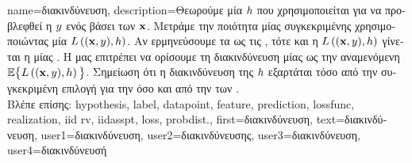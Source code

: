 {name={\foreignlanguage{greek}{διακινδύνευση}},
	description={\foreignlanguage{greek}{Θεωρούμε μία} 
		 $h$ \foreignlanguage{greek}{που χρησιμοποιείται για να προβλεφθεί η}  
		$y$ \foreignlanguage{greek}{ενός}  \foreignlanguage{greek}{βάσει των}  ${\bf x}$. 
		\foreignlanguage{greek}{Μετράμε την ποιότητα μίας συγκεκριμένης}  
		 \foreignlanguage{greek}{χρησιμοποιώντας μία}  $L\left(({\bf x},y),h \right)$. 
		\foreignlanguage{greek}{Αν ερμηνεύσουμε τα}  \foreignlanguage{greek}{ως τις}  
		 , \foreignlanguage{greek}{τότε και η 
		$L\left(({\bf x},y),h \right)$ γίνεται η}  
		\foreignlanguage{greek}{μίας} . \foreignlanguage{greek}{Η}  \foreignlanguage{greek}{μας επιτρέπει 
		να ορίσουμε τη διακινδύνευση μίας}  
		\foreignlanguage{greek}{ως την αναμενόμενη}  $\mathbb{E} \big\{L\left(({\bf x},y),h \right) \big\}$. 
		\foreignlanguage{greek}{Σημείωση ότι η διακινδύνευση της $h$ εξαρτάται τόσο από την συγκεκριμένη επιλογή 
		για την}  \foreignlanguage{greek}{όσο και από την}  
		\foreignlanguage{greek}{των} .\\
		\foreignlanguage{greek}{Βλέπε επίσης:} \gls{hypothesis}, \gls{label}, \gls{datapoint}, \gls{feature}, \gls{prediction}, \gls{lossfunc}, \gls{realization}, 
		\gls{iid} \gls{rv}, \gls{iidasspt}, \gls{loss}, \gls{probdist}.},
	first={\foreignlanguage{greek}{διακινδύνευση}},
	text={\foreignlanguage{greek}{διακινδύνευση}},
	user1={\foreignlanguage{greek}{διακινδύνευση}}, %
    	user2={\foreignlanguage{greek}{διακινδύνευσης}}, %
	user3={\foreignlanguage{greek}{διακινδύνευση}}, %
	user4={\foreignlanguage{greek}{διακινδύνευσή}} %
}

